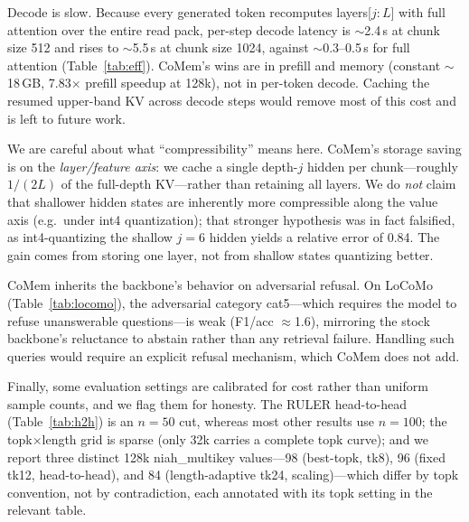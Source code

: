 Decode is slow. Because every generated token recomputes layers[$j{:}L$]
with full attention over the entire read pack, per-step decode latency is
$\sim$2.4\,s at chunk size 512 and rises to $\sim$5.5\,s at chunk size 1024,
against $\sim$0.3--0.5\,s for full attention (Table~\ref{tab:eff}). CoMem's
wins are in prefill and memory (constant $\sim$18\,GB, 7.83$\times$ prefill
speedup at 128k), not in per-token decode. Caching the resumed upper-band KV
across decode steps would remove most of this cost and is left to future work.

We are careful about what ``compressibility'' means here. CoMem's storage
saving is on the \emph{layer/feature axis}: we cache a single depth-$j$
hidden per chunk---roughly $1/(2L)$ of the full-depth KV---rather than
retaining all layers. We do \emph{not} claim that shallower hidden states
are inherently more compressible along the value axis (e.g.\ under int4
quantization); that stronger hypothesis was in fact falsified, as
int4-quantizing the shallow $j{=}6$ hidden yields a relative error of 0.84.
The gain comes from storing one layer, not from shallow states quantizing
better.

CoMem inherits the backbone's behavior on adversarial refusal. On LoCoMo
(Table~\ref{tab:locomo}), the adversarial category cat5---which requires the
model to refuse unanswerable questions---is weak (F1/acc $\approx$1.6),
mirroring the stock backbone's reluctance to abstain rather than any
retrieval failure. Handling such queries would require an explicit refusal
mechanism, which CoMem does not add.

Finally, some evaluation settings are calibrated for cost rather than uniform
sample counts, and we flag them for honesty. The RULER head-to-head
(Table~\ref{tab:h2h}) is an $n{=}50$ cut, whereas most other results use
$n{=}100$; the topk$\times$length grid is sparse (only 32k carries a complete
topk curve); and we report three distinct 128k niah\_multikey values---98
(best-topk, tk8), 96 (fixed tk12, head-to-head), and 84 (length-adaptive
tk24, scaling)---which differ by topk convention, not by contradiction, each
annotated with its topk setting in the relevant table.

